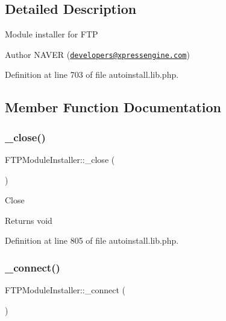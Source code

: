 \subsection{Detailed Description}
Module installer for F\+TP \begin{DoxyAuthor}{Author}
N\+A\+V\+ER (\href{mailto:developers@xpressengine.com}{\tt developers@xpressengine.\+com}) 
\end{DoxyAuthor}


Definition at line 703 of file autoinstall.\+lib.\+php.



\subsection{Member Function Documentation}
\hypertarget{classFTPModuleInstaller_a283ea106c86af1ab83e97ae852d07f57}{}\label{classFTPModuleInstaller_a283ea106c86af1ab83e97ae852d07f57} 
\subsubsection{\texorpdfstring{\+\_\+close()}{\_close()}}
{\footnotesize\ttfamily F\+T\+P\+Module\+Installer\+::\+\_\+close (\begin{DoxyParamCaption}{ }\end{DoxyParamCaption})}

Close

\begin{DoxyReturn}{Returns}
void 
\end{DoxyReturn}


Definition at line 805 of file autoinstall.\+lib.\+php.

\hypertarget{classFTPModuleInstaller_af6dd02408c44cc5e3903e7a8d195314b}{}\label{classFTPModuleInstaller_af6dd02408c44cc5e3903e7a8d195314b} 
\subsubsection{\texorpdfstring{\+\_\+connect()}{\_connect()}}
{\footnotesize\ttfamily F\+T\+P\+Module\+Installer\+::\+\_\+connect (\begin{DoxyParamCaption}{ }\end{DoxyParamCaption})}


